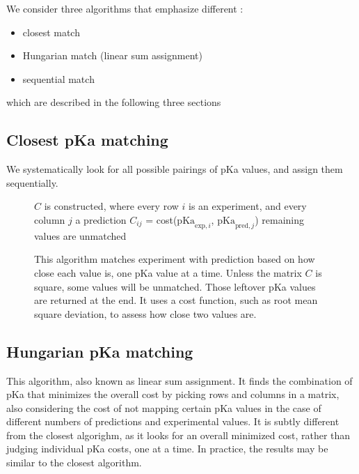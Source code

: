 \documentclass[9pt,lineno,final]{elife}
\newcommand{\pKa}{\mathrm{pKa}}
\begin{document}
We consider three algorithms that emphasize different :

\begin{itemize}
 \item closest match
 \item Hungarian match (linear sum assignment)
 \item sequential match
\end{itemize}

which are described in the following three sections

\subsection{Closest pKa matching}

We systematically look for all possible pairings of pKa values, and assign them sequentially. 

\begin{figure}[H]

\begin{algorithm}[H]
	\SetAlgoLined
	\caption{This algorithm matches experiment with prediction based on how close each value is, one pKa value at a time. Unless the matrix $C$ is square, some values will be unmatched. Those leftover pKa values are returned at the end. It uses a cost function, such as root mean square deviation, to assess how close two values are.}
	\label{alg:closest}
	 
	$C$ is constructed, where every row  $i$ is an experiment, and every column $j$ a prediction\;
	$C_{ij}$ = cost($\pKa_{\text{exp},i}$, $\pKa_{\text{pred},j}$)\;
	remaining values are unmatched\;

\end{algorithm}
\end{figure}


\subsection{Hungarian pKa matching}
This algorithm, also known as linear sum assignment.
%
It finds the combination of pKa that minimizes the overall cost by picking rows and columns in a matrix, also considering the cost of not mapping certain pKa values in the case of different numbers of predictions and experimental values.
%
It is subtly different from the closest algorighm, as it looks for an overall minimized cost, rather than judging individual pKa costs, one at a time. 
%
In practice, the results may be similar to the closest algorithm.
\end{document}
